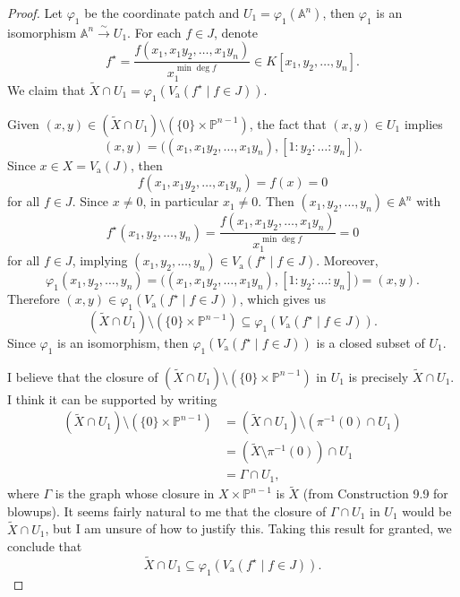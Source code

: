\documentclass[12pt]{article}
\theoremstyle{definition}
\renewcommand{\phi}{\varphi}
\newcommand{\<}{\langle}
\renewcommand{\>}{\rangle}
\newcommand{\Va}{V_{\mathrm{a}}}
\newcommand{\A}{\mathbb{A}}
\renewcommand{\P}{\mathbb{P}}
\newcommand{\blow}{\widetilde}
\newcommand{\belt}[2]{\big((#1), [#2]\big)}
\begin{document}
\begin{proof}
    Let $\phi_1$ be the coordinate patch and $U_1 = \phi_1(\A^n)$, then $\phi_1$ is an isomorphism $\A^n \xrightarrow{\sim} U_1$. For each $f \in J$, denote
    \[
        f^\star = \frac{f(x_1, x_1y_2, \dots, x_1y_n)}{x_1^{\min\deg f}} \in K[x_1, y_2, \dots, y_n].
    \]
    We claim that $\blow{X} \cap U_1 = \phi_1(\Va(f^\star \mid f \in J))$.
    
    Given $(x, y) \in (\blow{X} \cap U_1) \setminus (\{0\} \times \P^{n-1})$, the fact that $(x, y) \in U_1$ implies
    \[
        (x, y) = \belt{x_1, x_1y_2, \dots, x_1y_n}{1 : y_2 : \dots : y_n}.
    \]
    Since $x \in X = \Va(J)$, then
    \[
        f(x_1, x_1y_2, \dots, x_1y_n) = f(x) = 0
    \]
    for all $f \in J$. Since $x \ne 0$, in particular $x_1 \ne 0$. Then $(x_1, y_2, \dots, y_n) \in \A^n$ with
    \[
        f^\star(x_1, y_2, \dots, y_n)
            = \frac{f(x_1, x_1y_2, \dots, x_1y_n)}{x_1^{\min\deg f}}
            = 0
    \]
    for all $f \in J$, implying $(x_1, y_2, \dots, y_n) \in \Va(f^\star \mid f \in J)$. Moreover,
    \[
        \phi_1(x_1, y_2, \dots, y_n)
            = \belt{x_1, x_1y_2, \dots, x_1y_n}{1 : y_2 : \dots : y_n}
            = (x, y).
    \]
    Therefore $(x, y) \in \phi_1(\Va(f^\star \mid f \in J))$, which gives us
    \[
        (\blow{X} \cap U_1) \setminus (\{0\} \times \P^{n-1}) \subseteq \phi_1(\Va(f^\star \mid f \in J)).
    \]
    Since $\phi_1$ is an isomorphism, then $\phi_1(\Va(f^\star \mid f \in J))$ is a closed subset of $U_1$.

    I believe that the closure of $(\blow{X} \cap U_1) \setminus (\{0\} \times \P^{n-1})$ in $U_1$ is precisely $\blow{X} \cap U_1$. I think it can be supported by writing
    \begin{align*}
        (\blow{X} \cap U_1) \setminus (\{0\} \times \P^{n-1})
            &= (\blow{X} \cap U_1) \setminus (\pi^{-1}(0) \cap U_1) \\
            &= (\blow{X} \setminus \pi^{-1}(0)) \cap U_1 \\
            &= \Gamma \cap U_1,
    \end{align*}
    where $\Gamma$ is the graph whose closure in $X \times \P^{n-1}$ is $\blow{X}$ (from Construction 9.9 for blowups). It seems fairly natural to me that the closure of $\Gamma \cap U_1$ in $U_1$ would be $\blow{X} \cap U_1$, but I am unsure of how to justify this. Taking this result for granted, we conclude that
    \[
        \blow{X} \cap U_1 \subseteq \phi_1(\Va(f^\star \mid f \in J)).
    \]


\end{proof}
\end{document}
